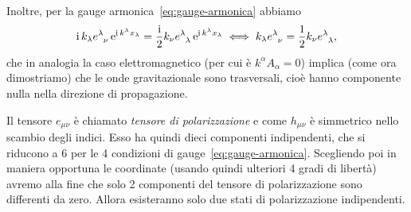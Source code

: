 Inoltre, per la  gauge armonica~\eqref{eq:gauge-armonica} abbiamo
\begin{equation}
  \uimm k_{\lambda} \tensor{e}{^{\lambda}_{\nu}} \e^{\uimm k^{\lambda}
    x_{\lambda}} = \frac{\uimm}{2} k_{\nu}
  \tensor{e}{^{\lambda}_{\lambda}} \e^{\uimm k^{\lambda}x_{\lambda}} \iff
  k_{\lambda} \tensor{e}{^{\lambda}_{\nu}} = \frac{1}{2} k_{\nu}
  \tensor{e}{^{\lambda}_{\lambda}},
  \label{8.22}
\end{equation}
che in analogia la caso elettromagnetico (per cui è $k^{\alpha} A_{\alpha}=0$)
implica (come ora dimostriamo) che le onde gravitazionale sono trasversali, cioè
hanno componente nulla nella direzione di propagazione.

Il tensore $e_{\mu\nu}$ è chiamato
\emph{tensore di polarizzazione} e come
$h_{\mu\nu}$ è simmetrico nello scambio degli indici.  Esso ha quindi dieci
componenti indipendenti, che si riducono a 6 per le 4 condizioni di
gauge~\eqref{eq:gauge-armonica}.  Scegliendo poi in maniera opportuna le
coordinate (usando quindi ulteriori 4 gradi di libertà) avremo alla fine che
solo 2 componenti del tensore di polarizzazione sono differenti da zero.  Allora
esisteranno solo due stati di polarizzazione indipendenti.

